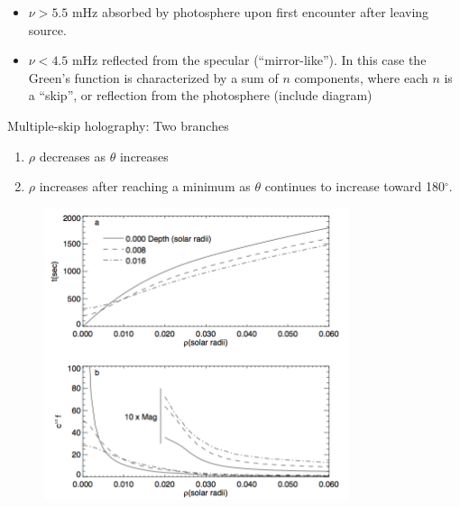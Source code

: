 \documentclass{beamer}
\begin{document}
\begin{frame}{8.7}
    \begin{itemize}
        \item $\nu>5.5$ mHz absorbed by photosphere upon first
            encounter after leaving source.
        \item $\nu<4.5$ mHz reflected from the specular
            (``mirror-like''). In this case the Green's function
            is characterized by a sum of $n$ components, where
            each $n$ is a ``skip'', or reflection from the photosphere
            (include diagram)
    \end{itemize}
\end{frame}

\begin{frame}{8.8}
    Multiple-skip holography: Two branches
    \begin{enumerate}
        \item $\rho$ decreases as $\theta$ increases
        \item $\rho$ increases after reaching a minimum as $\theta$
            continues to increase toward 180$^{\circ}$.
    \end{enumerate}
\end{frame}

\begin{frame}
    \begin{figure}
        \includegraphics[width=0.8\textwidth]{fig_8.png}
    \end{figure}
\end{frame}
\end{document}
